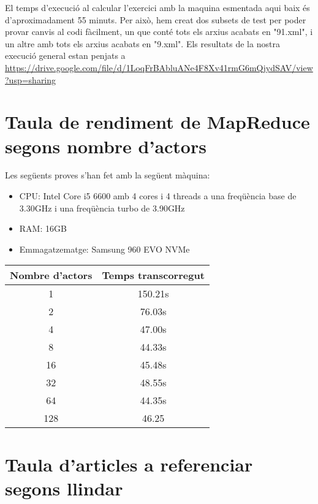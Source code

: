 \documentclass[11pt,a4paper,twoside]{report}
\begin{document}
El temps d'execució al calcular l'exercici amb la maquina esmentada aqui baix és d'aproximadament 55 minuts. Per això, hem creat dos subsets de test per poder provar canvis al codi fàcilment, un que conté tots els arxius acabats en "91.xml",
 i un altre amb tots els arxius acabats en "9.xml". Els resultats de la nostra execució general estan penjats a \url{https://drive.google.com/file/d/1LoqFrBAbluANe4F8Xv41rmG6mQjydSAV/view?usp=sharing}

\section{Taula de rendiment de MapReduce segons nombre d'actors}

Les següents proves s'han fet amb la següent màquina:
\begin{itemize}
  \item CPU: Intel Core i5 6600 amb 4 cores i 4 threads a una freqüència base de 3.30GHz i una freqüència turbo de 3.90GHz
  \item RAM: 16GB
  \item Emmagatzematge: Samsung 960 EVO NVMe
\end{itemize}


\begin{tabular}{|c|c|}
  \hline
  \rowcolor[HTML]{ECF4FF}
  \textbf{Nombre d'actors} & \textbf{Temps transcorregut} \\ \hline
  1                        & 150.21s                      \\ \hline
  2                        & 76.03s                       \\ \hline
  4                        & 47.00s                       \\ \hline
  8                        & 44.33s                       \\ \hline
  16                       & 45.48s                       \\ \hline
  32                       & 48.55s                       \\ \hline
  64                       & 44.35s                       \\ \hline
  128                      & 46.25                        \\ \hline
\end{tabular}

\section{Taula d'articles a referenciar segons llindar}
\end{document}
